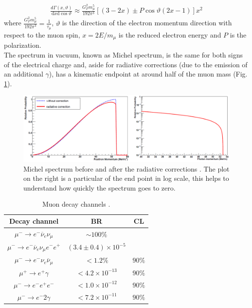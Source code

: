 \documentclass[12pt,a4paper,openright, oneside, titlepage]{book} %
\begin{document}
\begin{align}
\frac{d\Gamma(x,\vartheta)}{\mathrm dx \mathrm d\cos\vartheta}\approx \frac{G_F^2m_\mu^5}{192\pi^3}[(3-2x)\pm P\cos\vartheta(2x-1)]x^2
\label{eq_muon}
\end{align}
where $\frac{G_F^2m_\mu^5}{192\pi^3}=\frac{1}{\tau_\mu}$, $\vartheta$ is the direction of the electron momentum direction with respect to the muon spin, $x=2E/m_{\mu}$ is the reduced electron energy and $P$ is the polarization.\\
The spectrum in vacuum, known as Michel spectrum, is the same for both signs of the electrical charge and, aside for radiative corrections (due to the emission of an additional $\gamma$), has a kinematic endpoint at around half of the muon mass (Fig. \ref{_Michel}).\\

\begin{figure}[h!]
\centering
\includegraphics[scale=0.5]{Michel}
\caption[Michel spectrum]{Michel spectrum before and after the radiative corrections \cite{signorelli}. The plot on the right is a particular of the end point in log scale, this helps to understand how quickly the spectrum goes to zero.}
\label{_Michel}
\end{figure}

\begin{table}
\centering
\begin{tabular}{|c|c|c|}
\hline
Decay channel & BR & CL\\
\hline
\hline
$\mu^- \rightarrow e^-\overline{\nu}_e\nu_\mu$&$\sim100\%$&\\
$\mu^- \rightarrow e^-\overline{\nu}_e\nu_\mu e^-e^+$&
$(3.4\pm0.4)\times10^{-5}$&\\
\hline
$\mu^- \rightarrow e^-\nu_e\overline{\nu}_\mu$&$<1.2\%$&$90\%$\\
$\mu^+ \rightarrow e^+\gamma$&$<4.2\times10^{-13}$&$90\%$\\
$\mu^- \rightarrow e^-e^+e^-$&$<1.0\times10^{-12}$&$90\%$\\
$\mu^- \rightarrow e^-2\gamma$&$<7.2\times10^{-11}$&$90\%$\\
\hline
\end{tabular}
\caption[Muon decay channels]{Muon decay channels \cite{PDG}.}
\label{T_mu}
\end{table}
\end{document}
